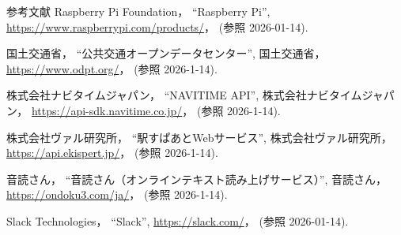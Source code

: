 \begin{thebibliography}{参考文献}
  Raspberry Pi Foundation，
  ``Raspberry Pi'',
  \url{https://www.raspberrypi.com/products/}，
  (参照 2026-01-14).


  国土交通省，
  ``公共交通オープンデータセンター'',
  国土交通省，
  \url{https://www.odpt.org/}，
  (参照 2026-1-14).

  株式会社ナビタイムジャパン，
  ``NAVITIME API'',
  株式会社ナビタイムジャパン，
  \url{https://api-sdk.navitime.co.jp/}，
  (参照 2026-1-14).

  株式会社ヴァル研究所，
  ``駅すぱあとWebサービス'',
  株式会社ヴァル研究所，
  \url{https://api.ekispert.jp/}，
  (参照 2026-1-14).


  音読さん，
  ``音読さん（オンラインテキスト読み上げサービス）'',
  音読さん，
  \url{https://ondoku3.com/ja/}，
  (参照 2026-1-14).


  Slack Technologies，
  ``Slack'',
  \url{https://slack.com/}，
  (参照 2026-01-14).





\end{thebibliography}

